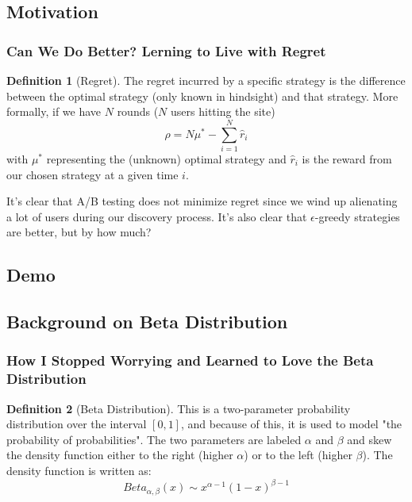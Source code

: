\documentclass[]{beamer}
\theoremstyle{definition}
\newtheorem{defn}{Definition}[section]
\begin{document}
\subsection{Motivation}
\begin{frame}
\frametitle{Can We Do Better?  Lerning to Live with Regret}
\begin{defn}[Regret]
The regret incurred by a specific strategy is the difference between the optimal strategy (only known in hindsight) and that strategy.  More formally, if we have $N$ rounds ($N$ users hitting the site)
$$
\rho = N\mu^{*} - \sum_{i=1}^N\hat{r}_i
$$
with $\mu^*$ representing the (unknown) optimal strategy and $\hat{r}_i$ is the reward from our chosen strategy at a given time $i$.
\end{defn}
It's clear that A/B testing does not minimize regret since we wind up alienating a lot of users during our discovery process.  It's also clear that $\epsilon$-greedy strategies are better, but by how much?
\end{frame}
\subsection{Demo}


\subsection{Background on Beta Distribution}
\begin{frame}
\frametitle{How I Stopped Worrying and Learned to Love the Beta Distribution}
\begin{defn}[Beta Distribution]
This is a two-parameter probability distribution over the interval $[0, 1]$, and because of this, it is used to model "the probability of probabilities".  The two parameters are labeled $\alpha$ and $\beta$ and skew the density function either to the right (higher $\alpha$) or to the left (higher $\beta$).  The density function is written as:
$$
Beta_{\alpha, \beta}(x) \sim x^{\alpha - 1}(1 - x)^{\beta - 1}
$$
\end{defn}\pause
\end{frame}
\end{document}
